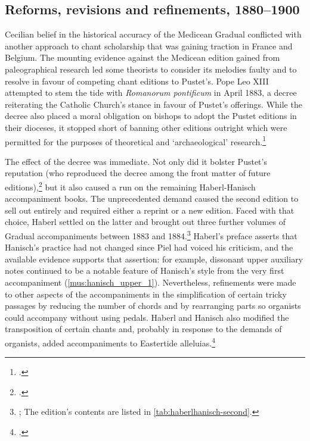 \subsection{Reforms, revisions and refinements, 1880--1900}
Cecilian belief in the historical accuracy of the Medicean Gradual conflicted with another approach to chant scholarship that was gaining traction in France and Belgium.
The mounting evidence against the Medicean edition gained from paleographical research led some theorists to consider its melodies faulty and to resolve in favour of competing chant editions to Pustet's.
Pope Leo XIII attempted to stem the tide with \emph{Romanorum pontificum} in April 1883, a decree reiterating the Catholic Church's stance in favour of Pustet's offerings.
While the decree also placed a moral obligation on bishops to adopt the Pustet editions in their dioceses, it stopped short of banning other editions outright which were permitted for the purposes of theoretical and `archaeological' research.\footcite[159--161]{HayburnPapalLegislationSacred1979}

The effect of the decree was immediate.
Not only did it bolster Pustet's reputation (who reproduced the decree among the front matter of future editions),\footcite[pp.~iii--vi]{Gradualetemporesanctis1884} but it also caused a run on the remaining Haberl-Hanisch accompaniment books.
The unprecedented demand caused the second edition to sell out entirely and required either a reprint or a new edition.
Faced with that choice, Haberl settled on the latter and brought out three further volumes of Gradual accompaniments between 1883 and 1884.\footnote{\cite[82]{HaberlvollstaendigeOrgelbegleitungGraduale1895}; The edition's contents are listed in \cref{tab:haberlhanisch-second}.}
Haberl's preface asserts that Hanisch's practice had not changed since Piel had voiced his criticism, and the available evidence supports that assertion: for example, dissonant upper auxiliary notes continued to be a notable feature of Hanisch's style from the very first accompaniment (\cref{mus:hanisch_upper_1}).
Nevertheless, refinements were made to other aspects of the accompaniments in the simplification of certain tricky passages by reducing the number of chords and by rearranging parts so organists could accompany without using pedals.
Haberl and Hanisch also modified the transposition of certain chants and, probably in response to the demands of organists, added accompaniments to Eastertide alleluias.\footcite[2nd~ed., unpaginated `Vorwort zur zweiten Auflage' and p.~1]{HanischOrganumcomitansad1883}


